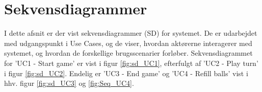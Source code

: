 \documentclass[Arkitektur/System_main.tex]{subfiles}
\begin{document}
\section{Sekvensdiagrammer}

I dette afsnit er der vist sekvensdiagrammer (SD) for systemet. De er udarbejdet med udgangspunkt i Use Cases, og de viser, hvordan aktørerne interagerer med systemet, og hvordan de forskellige brugsscenarier forløber. Sekvensdiagrammet for 'UC1 - Start game' er vist i figur \ref{fig:sd_UC1}, efterfulgt af 'UC2 - Play turn' i figur \ref{fig:sd_UC2}. Endelig er 'UC3 - End game' og 'UC4 - Refill balls' vist i hhv. figur \ref{fig:sd_UC3} og \ref{fig:Seq_UC4}. \newpage





\end{document}
